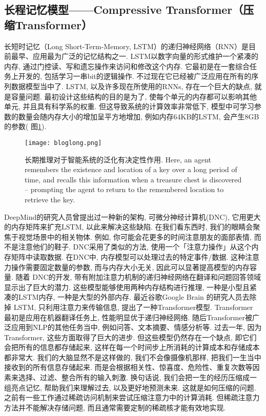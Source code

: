 \subsection{长程记忆模型——Compressive Transformer（压缩Transformer）}
长短时记忆（Long Short-Term-Memory, LSTM）的递归神经网络（RNN）是目前最早、应用最为广泛的记忆结构之一. LSTM以数字向量的形式维护一个紧凑的内存, 通过门控读、写和遗忘操作来访问和修改这个内存. 它最初是在一套综合任务上开发的, 包括学习一串bit的逻辑操作. 不过现在它已经被广泛应用在所有的序列数据模型当中了.
LSTM, 以及许多现在所使用的RNNs, 存在一个巨大的缺点, 就是容量问题. 最初设计这些结构的目的是为了, 使每个单元的内存都可以影响其他单元, 并且具有科学系的权重. 但这导致系统的计算效率非常低下, 模型中可学习参数的数量会随内存大小的增加呈平方地增加, 例如内存64KB的LSTM, 会产生8GB的参数( 图\ref{bloglong}).
\begin{figure}[H]
\centering
\texttt{[image: bloglong.png]}
\caption{长期推理对于智能系统的泛化有决定性作用. Here, an agent remembers the existence and location of a key over a long period of time, and recalls this information when a treasure chest is discovered – prompting the agent to return to the remembered location to retrieve the key.}
\label{bloglong}
\end{figure}

DeepMind的研究人员曾提出过一种新的架构, 可微分神经计算机(DNC), 它用更大的内存矩阵来扩充LSTM, 以此来解决这些缺陷.
在我们看东西时, 我们的眼睛会聚焦于视觉场景中的相关物体. 例如, 你可能会花更多的时间注意朋友的面部表情, 而不是注意他们的鞋子.
DNC采用了类似的方法, 使用一个「注意力操作」从这个内存矩阵中读取数据.
在DNC中, 内存模型可以处理过去的特定事件/数据. 这种注意力操作需要固定数量的参数, 而与内存大小无关, 因此可以显著提高模型的内存容量.
随着 DNC的开发, 带有附加注意力机制的递归神经网络在翻译和问题回答领域显示出了巨大的潜力. 这些模型能够使用两种内存结构进行推理, 一种是小型且紧凑的LSTM内存, 一种是大型的外部内存.
最近谷歌Google Brain 的研究人员去除掉 LSTM, 只利用注意力来传输信息, 提出了一种Transformer模型.
Transformer 最初是应用在机器翻译任务上, 性能明显优于递归神经网络.
随后Transformer被广泛应用到NLP的其他任务当中, 例如问答、文本摘要、情感分析等. 过去一年, 因为Transformer, 这些方面取得了巨大的进步.
但这些模型仍然存在一个缺点, 即它们会把所有的信息都存储起来, 这样在每一个时间步上所消耗的计算成本和存储成本都非常大.
我们的大脑显然不是这样做的, 我们不会像摄像机那样, 把我们一生当中接收到的所有信息存储起来. 而是会根据相关性、惊喜度、危险性、重复次数等因素来选择、过滤、整合所有的输入刺激. 换句话说, 我们会把一生的经历压缩成一组亮点记忆, 帮助我们来理解过去, 以及更好地预测未来.
这就是如何压缩的问题.
之前有一些工作通过稀疏访问机制来尝试压缩注意力中的计算消耗. 但稀疏注意力方法并不能解决存储问题, 而且通常需要定制的稀疏核才能有效地实现.

